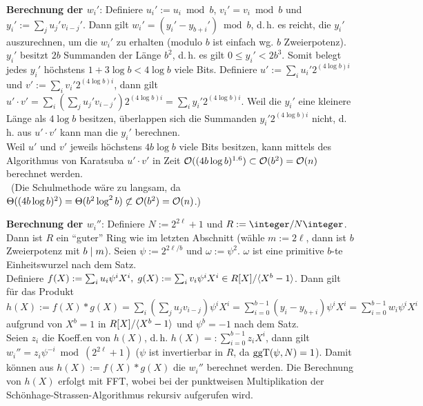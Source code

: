 \linie

\textbf{Berechnung der $w_i'$}:
Definiere $u_i' := u_i \bmod b$, $v_i' = v_i \bmod b$ und $y_i' := \sum_j u_j' v_{i-j}'$.
Dann gilt $w_i' = (y_i' - y_{b+i}') \bmod b$, d.\,h. es reicht, die $y_i'$ auszurechnen,
um die $w_i'$ zu erhalten
(modulo $b$ ist einfach wg. $b$ Zweierpotenz).\\
$y_i'$ besitzt $2b$ Summanden der Länge $b^2$, d.\,h. es gilt $0 \le y_i' < 2b^3$.
Somit belegt jedes $y_i'$ höchstens $1 + 3 \log b < 4\log b$ viele Bits.
Definiere $u' := \sum_i u_i' 2^{(4\log b)i}$ und $v' := \sum_i v_i' 2^{(4\log b)i}$,
dann gilt $u' \cdot v' = \sum_i (\sum_j u_j' v_{i-j}') 2^{(4\log b)i}
= \sum_i y_i' 2^{(4\log b) i}$.
Weil die $y_i'$ eine kleinere Länge als $4\log b$ besitzen, überlappen sich die Summanden
$y_i' 2^{(4\log b) i}$ nicht, d.\,h. aus $u' \cdot v'$ kann man die $y_i'$
berechnen.\\
Weil $u'$ und $v'$ jeweils höchstens $4b\log b$ viele Bits besitzen, kann mittels des
Algorithmus von Karatsuba $u' \cdot v'$ in Zeit $\mathcal{O}((4b\log b)^{1.6}) \subset \mathcal{O}(b^2) = \mathcal{O}(n)$
berechnet werden.\\\
(Die Schulmethode wäre zu langsam, da
$\Theta((4b\log b)^2) = \Theta(b^2 \log^2 b) \not\subset \mathcal{O}(b^2) = \mathcal{O}(n)$.)

\linie
\pagebreak

\textbf{Berechnung der $w_i''$}:
Definiere $N := 2^{2\ell}+1$ und $R := \integer/N\integer$.
Dann ist $R$ ein "`guter"' Ring wie im letzten Abschnitt (wähle $m := 2\ell$,
dann ist $b$ Zweierpotenz mit $b \mid m$).
Seien $\psi := 2^{2\ell/b}$ und $\omega := \psi^2$.
$\omega$ ist eine primitive $b$-te Einheitswurzel nach dem Satz.\\
Definiere $f(X) := \sum_i u_i \psi^i X^i,\;
g(X) := \sum_i v_i \psi^i X^i \in R[X]/\langle X^b - 1\rangle$.
Dann gilt für das Produkt
$h(X) := f(X) \ast g(X) = \sum_i (\sum_j u_j v_{i-j}) \psi^i X^i
= \sum_{i=0}^{b-1} (y_i - y_{b+i}) \psi^i X^i
= \sum_{i=0}^{b-1} w_i \psi^i X^i$
aufgrund von $X^b = 1$ in $R[X]/\langle X^b - 1\rangle$ und $\psi^b = -1$ nach dem Satz.\\
Seien $z_i$ die Koeff.en von $h(X)$, d.\,h.
$h(X) =: \sum_{i=0}^{b-1} z_i X^i$, dann gilt
$w_i'' = z_i \psi^{-i} \bmod (2^{2\ell}+1)$
($\psi$ ist invertierbar in $R$, da $\operatorname{ggT}(\psi, N) = 1$).
Damit können aus $h(X) := f(X) \ast g(X)$ die $w_i''$ berechnet werden.
Die Berechnung von $h(X)$ erfolgt mit FFT, wobei bei der punktweisen Multiplikation der
Schönhage-Strassen-Algorithmus rekursiv aufgerufen wird.

